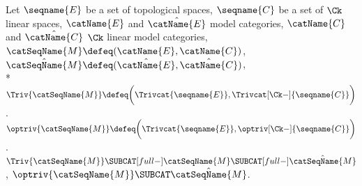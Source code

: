 \documentclass{article}
\begin{document}
\begin{definition}
\label{def:CktoLCS}
Let $\seqname{E}$ be a set of topological spaces,
$\seqname{C}$ be a set of $\Ck$ linear spaces,
$\catName{E}$ and $\hat{\catName{E}}$ model categories,
$\catName{C}$ and $\hat{\catName{C}}$ $\Ck$ linear model categories,
$\catSeqName{M} \defeq (\catName{E}, \catName{C})$,
$
  \hat{\catSeqName{M}} \defeq
  (\hat{\catName{E}}, \hat{\catName{C}})
$, \\*
$
  \Triv{\catSeqName{M}} \defeq
  \biggl ( \Trivcat{\seqname{E}}, \Trivcat[\Ck-]{\seqname{C}} \biggr )
$.
$
  \optriv{\catSeqName{M}} \defeq
  \biggl ( \Trivcat{\seqname{E}}, \optriv[\Ck-]{\seqname{C}} \biggr )
$.
$
  \Triv{\catSeqName{M}} \SUBCAT[full-] \catSeqName{M}
  \SUBCAT[full-] \hat{\catSeqName{M}}
$,
$\optriv{\catSeqName{M}} \SUBCAT \hat{\catSeqName{M}}$.


\end{definition}
\end{document}
